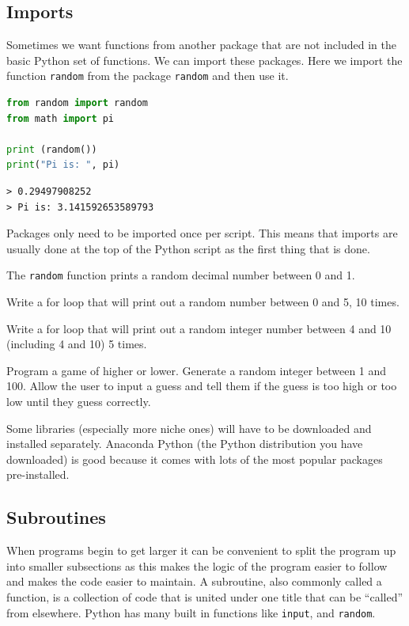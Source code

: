 	\subsection{Imports}
		Sometimes we want functions from another package that are not included in the basic Python set of functions. We can import these packages. Here we import the function \texttt{random} from the package \texttt{random} and then use it.
\begin{minipage}{\linewidth}		
\begin{lstlisting}[language=Python]
from random import random
from math import pi

print (random())
print("Pi is: ", pi)\end{lstlisting}
\end{minipage}
		\begin{verbatim}
> 0.29497908252
> Pi is: 3.141592653589793\end{verbatim}
		Packages only need to be imported once per script. This means that imports are usually done at the top of the Python script as the first thing that is done.
		
		The \texttt{random} function prints a random decimal number between 0 and 1.
		\begin{task}Write a for loop that will print out a random number between 0 and 5, 10 times.\end{task}
		\begin{task}Write a for loop that will print out a random integer number between 4 and 10 (including 4 and 10) 5 times.\end{task}
		\begin{task}Program a game of higher or lower. Generate a random integer between 1 and 100. Allow the user to input a guess and tell them if the guess is too high or too low until they guess correctly.\end{task}		
	Some libraries (especially more niche ones) will have to be downloaded and installed separately. Anaconda Python (the Python distribution you have downloaded) is good because it comes with lots of the most popular packages pre-installed.
	\subsection{Subroutines}
			When programs begin to get larger it can be convenient to split the program up into smaller subsections as this makes the logic of the program easier to follow and makes the code easier to maintain. A subroutine, also commonly called a function, is a collection of code that is united under one title that can be ``called'' from elsewhere. Python has many built in functions like \texttt{input}, and \texttt{random}.

